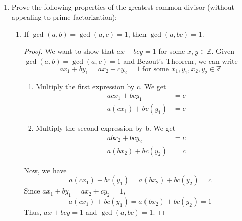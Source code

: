 \documentclass[letterpaper]{article}
\begin{document}
\begin{enumerate}
\begin{proof}
	\end{proof}

	\item Prove the following properties of the greatest common divisor (without appealing to prime
	factorization):
	\begin{enumerate}
		\item If $\gcd(a, b) = \gcd(a, c) = 1$, then $\gcd(a, bc) = 1$.
			\begin{proof}
				We want to show that $ax+bcy = 1$ for some $x,y\in\mathbb{Z}$.
				Given $\gcd(a, b) = \gcd(a, c) = 1$ and Bezout's Theorem, we can write
				\[
					ax_1 + by_1 = ax_2 + cy_2 = 1 \text{ for some } x_1,y_1,x_2,y_2 \in\mathbb{Z}
				\]			
				\begin{enumerate}
					\item Multiply the first expression by c. We get
					\begin{align*}
						acx_1+bcy_1 &= c \\
						a(cx_1)+bc(y_1) &= c
					\end{align*}
					\item Multiply the second expression by b. We get
					\begin{align*}
						abx_2+bcy_2 &= c \\
						a(bx_2)+bc(y_2) &= c
					\end{align*}
				\end{enumerate}
				Now, we have 
				\[ a(cx_1)+bc(y_1) = a(bx_2)+bc(y_2) = c \] 
				Since $ax_1+by_1=ax_2+cy_2=1$,
				\[ a(cx_1)+bc(y_1) = a(bx_2)+bc(y_2) = 1 \] 
				Thus, $ax+bcy = 1$ and $\gcd(a, bc) = 1$.
			\end{proof}


\end{enumerate}
\end{enumerate}
\end{document}
